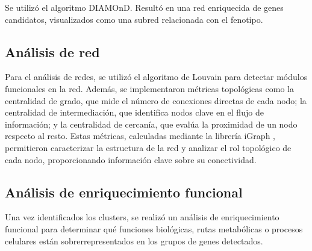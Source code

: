 Se utilizó el algoritmo DIAMOnD. Resultó en una red enriquecida de genes candidatos, visualizados como una subred relacionada con el fenotipo.
\subsection{Análisis de red}

Para el análisis de redes, se utilizó el algoritmo de Louvain \cite{Blondel2008} para detectar módulos funcionales en la red. Además, se implementaron métricas topológicas como la centralidad de grado, que mide el número de conexiones directas de cada nodo; la centralidad de intermediación, que identifica nodos clave en el flujo de información; y la centralidad de cercanía, que evalúa la proximidad de un nodo respecto al resto. Estas métricas, calculadas mediante la librería iGraph \cite{Csardi2006}, permitieron caracterizar la estructura de la red y analizar el rol topológico de cada nodo, proporcionando información clave sobre su conectividad.

\subsection{Análisis de enriquecimiento funcional}

Una vez identificados los clusters, se realizó un análisis de enriquecimiento funcional para determinar qué funciones biológicas, rutas metabólicas o procesos celulares están sobrerrepresentados en los grupos de genes detectados.